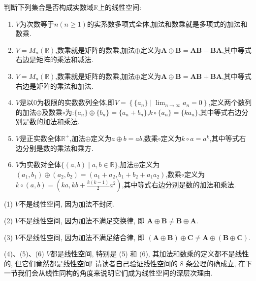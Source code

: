 \documentclass[../../main.tex]{subfiles}%
\begin{document}
\begin{example}\label{example:3.3}
判断下列集合是否构成实数域\(\mathbb{R}\)上的线性空间:
\begin{enumerate}[(1)]
\item \(V\)为次数等于\(n(n\geqslant 1)\)的实系数多项式全体,加法和数乘就是多项式的加法和数乘.
\item \(V = M_n(\mathbb{R})\),数乘就是矩阵的数乘,加法\(\oplus\)定义为\(\boldsymbol{A}\oplus\boldsymbol{B}=\boldsymbol{A}\boldsymbol{B}-\boldsymbol{B}\boldsymbol{A}\),其中等式右边是矩阵的乘法和减法.
\item \(V = M_n(\mathbb{R})\),数乘就是矩阵的数乘,加法\(\oplus\)定义为\(\boldsymbol{A}\oplus\boldsymbol{B}=\boldsymbol{A}\boldsymbol{B}+\boldsymbol{B}\boldsymbol{A}\),其中等式右边是矩阵的乘法和加法.
\item \label{example:3.3(4)}\(V\)是以\(0\)为极限的实数数列全体,即\(V = \left\{\{a_n\}\mid\lim_{n\rightarrow\infty}a_n = 0\right\}\),定义两个数列的加法\(\oplus\)及数乘\(\circ\)为:\(\{a_n\}\oplus\{b_n\}=\{a_n + b_n\}\),\(k\circ\{a_n\}=\{ka_n\}\),其中等式右边分别是数的加法和乘法.
\item \label{example:3.3(5)}\(V\)是正实数全体\(\mathbb{R}^+\),加法\(\oplus\)定义为\(a\oplus b = ab\),数乘\(\circ\)定义为\(k\circ a = a^k\),其中等式右边分别是数的乘法和乘方.
\item \label{example:3.3(6)}\(V\)为实数对全体\(\{(a,b)\mid a,b\in\mathbb{R}\}\),加法\(\oplus\)定义为\((a_1,b_1)\oplus(a_2,b_2)=(a_1 + a_2,b_1 + b_2 + a_1a_2)\),数乘\(\circ\)定义为\(k\circ(a,b)=(ka,kb+\frac{k(k - 1)}{2}a^2)\),其中等式右边分别是数的加法和乘法.
\end{enumerate}
\end{example}
\begin{solution}

(1) \(V\)不是线性空间, 因为加法不封闭.

(2) \(V\)不是线性空间, 因为加法不满足交换律, 即 \(\boldsymbol{A}\oplus\boldsymbol{B}\neq\boldsymbol{B}\oplus\boldsymbol{A}\).

(3) \(V\)不是线性空间, 因为加法不满足结合律, 即 \((\boldsymbol{A}\oplus\boldsymbol{B})\oplus\boldsymbol{C}\neq\boldsymbol{A}\oplus(\boldsymbol{B}\oplus\boldsymbol{C})\).

(4)、(5)、(6) \(V\)都是线性空间, 特别是 (5) 和 (6), 其加法和数乘的定义都不是线性的, 但它们竟然都是线性空间! 请读者自己验证线性空间的 8 条公理的确成立, 在下一节我们会从线性同构的角度来说明它们成为线性空间的深层次理由.

\end{solution}
\end{document}
